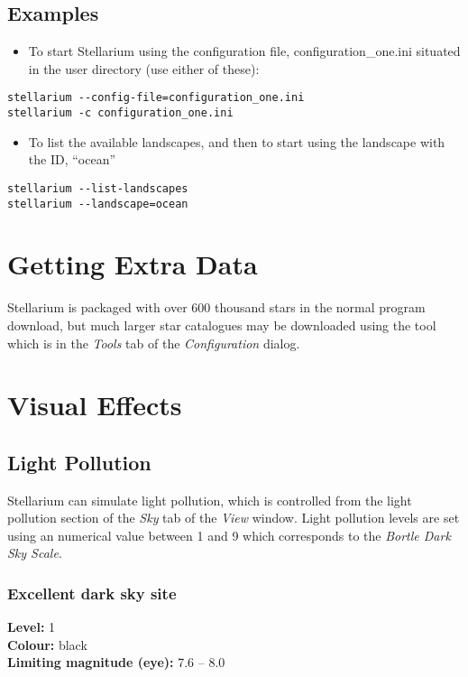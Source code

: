 \section{Examples}\label{examples}

\begin{itemize}
\item
  To start Stellarium using the configuration file,
  configuration\_one.ini situated in the user directory (use either of
  these):
\end{itemize}

\texttt{stellarium~-\/-config-file=configuration\_one.ini}\\
\texttt{stellarium~-c~configuration\_one.ini}

\begin{itemize}
\item
  To list the available landscapes, and then to start using the
  landscape with the ID, ``ocean''
\end{itemize}

\texttt{stellarium~-\/-list-landscapes}\\
\texttt{stellarium~-\/-landscape=ocean}

\chapter{Getting Extra Data}\label{getting-extra-star-data}

Stellarium is packaged with over 600 thousand stars in the normal
program download, but much larger star catalogues may be downloaded
using the tool which is in the \emph{Tools} tab of the
\emph{Configuration} dialog.

\chapter{Visual Effects}\label{visual-effects}

\section{Light Pollution}\label{light-pollution}

Stellarium can simulate light pollution, which is controlled from the
light pollution section of the \emph{Sky} tab of the \emph{View} window.
Light pollution levels are set using an numerical value between 1 and 9
which corresponds to the \emph{Bortle Dark Sky Scale}.

\subsection{Excellent dark sky site}
\textbf{Level:} 1 \\
\textbf{Colour:} black \\
\textbf{Limiting magnitude (eye):} 7.6 -- 8.0

